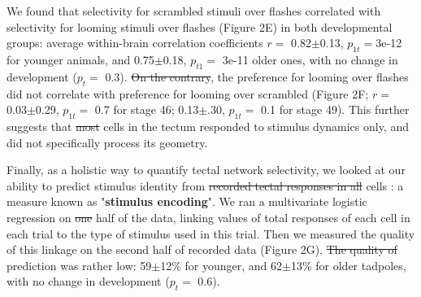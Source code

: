 \documentclass{article}
\providecommand{\DIFaddtex}[1]{{\protect\color{blue}{#1}}} %
\providecommand{\DIFdeltex}[1]{{\protect\color{red}\sout{#1}}}                      %
\providecommand{\DIFaddbegin}{} %
\providecommand{\DIFaddend}{} %
\providecommand{\DIFdelbegin}{} %
\providecommand{\DIFdelend}{} %
\providecommand{\DIFadd}[1]{\texorpdfstring{\DIFaddtex{#1}}{#1}} %
\providecommand{\DIFdel}[1]{\texorpdfstring{\DIFdeltex{#1}}{}} %
\newcommand{\DIFscaledelfig}{0.5}
\newlength{\DIFdelgraphicswidth} %
\newlength{\DIFdelgraphicsheight} %
\newcommand{\DIFaddincludegraphics}[2][]{{\color{blue}\fbox{\DIFOincludegraphics[#1]{#2}}}} %
\newcommand{\DIFdelincludegraphics}[2][]{%
\sbox{\DIFdelgraphicsbox}{\DIFOincludegraphics[#1]{#2}}%
\settoboxwidth{\DIFdelgraphicswidth}{\DIFdelgraphicsbox} %
\settoboxtotalheight{\DIFdelgraphicsheight}{\DIFdelgraphicsbox} %
\scalebox{\DIFscaledelfig}{%
\parbox[b]{\DIFdelgraphicswidth}{\usebox{\DIFdelgraphicsbox}\\[-\baselineskip] \rule{\DIFdelgraphicswidth}{0em}}\llap{\resizebox{\DIFdelgraphicswidth}{\DIFdelgraphicsheight}{%
\setlength{\unitlength}{\DIFdelgraphicswidth}%
\begin{picture}(1,1)%
\thicklines\linethickness{2pt} %
{\color[rgb]{1,0,0}\put(0,0){\framebox(1,1){}}}%
{\color[rgb]{1,0,0}\put(0,0){\line( 1,1){1}}}%
{\color[rgb]{1,0,0}\put(0,1){\line(1,-1){1}}}%
\end{picture}%
}\hspace*{3pt}}} %
} %
\DeclareRobustCommand{\DIFaddbegin}{\DIFOaddbegin \let\includegraphics\DIFaddincludegraphics} %
\DeclareRobustCommand{\DIFaddend}{\DIFOaddend \let\includegraphics\DIFOincludegraphics} %
\DeclareRobustCommand{\DIFdelbegin}{\DIFOdelbegin \let\includegraphics\DIFdelincludegraphics} %
\DeclareRobustCommand{\DIFdelend}{\DIFOaddend \let\includegraphics\DIFOincludegraphics} %
\begin{document}
We found that selectivity for scrambled stimuli over flashes correlated with selectivity for looming stimuli over flashes (Figure 2E) in both developmental groups: average within-brain correlation coefficients $r=$ 0.82$\pm$0.13, $p_{1t}=$3e-12 for younger animals, and 0.75$\pm$0.18, $p_{t1}=$ 3e-11 older ones, with no change in development ($p_t=$ 0.3). \DIFdelbegin \DIFdel{On the contrary}\DIFdelend \DIFaddbegin \DIFadd{In contrast to that}\DIFaddend , the preference for looming over flashes did not correlate with preference for looming over scrambled (Figure 2F; $r=$ 0.03$\pm$0.29, $p_{1t}=$ 0.7 for stage 46; 0.13$\pm$.30, $p_{1t}=$ 0.1 for stage 49). This further suggests that \DIFdelbegin \DIFdel{most }\DIFdelend \DIFaddbegin \DIFadd{the majority of }\DIFaddend cells in the tectum responded to stimulus dynamics only, and did not specifically process its geometry.

Finally, as a holistic way to quantify tectal network selectivity, we looked at our ability to predict stimulus identity from \DIFdelbegin \DIFdel{recorded tectal responses in all }\DIFdelend \DIFaddbegin \DIFadd{all recorded responses in tectal }\DIFaddend cells \citep{avitan2016limitations}: a measure known as "\textbf{stimulus encoding}". We ran a multivariate logistic regression on \DIFdelbegin \DIFdel{one }\DIFdelend \DIFaddbegin \DIFadd{first }\DIFaddend half of the data, linking values of total responses of each cell in each trial to the type of stimulus used in this trial. Then we measured the quality of this linkage on the second half of recorded data (Figure 2G). \DIFdelbegin \DIFdel{The quality of }\DIFdelend \DIFaddbegin \DIFadd{We found that with the dynamics of responses disregarded (with predictions based only on the total spiking output of each cell), the quality of these }\DIFaddend prediction was rather low: 59$\pm$12\% for younger, and 62$\pm$13\% for older tadpoles, with no change in development ($p_t=$ 0.6).
\end{document}
